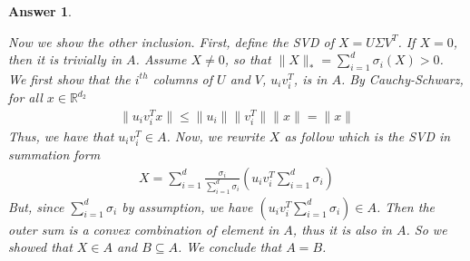 \documentclass[12pt]{article}
\theoremstyle{colon}
\newtheorem*{answer}{Answer}
\begin{document}
\begin{answer}
\begin{enumerate}[label=\arabic*)]
\begin{enumerate}[label=\alph*)]
          Now we show the other inclusion. First, define the SVD of $X = U \Sigma V^T$. If $X = 0$, then it is trivially in $A$. Assume $X \neq 0$, so that $\lVert X \rVert_* = \sum_{i=1}^d \sigma_i(X) > 0$. We first show that the $i^{th}$ columns of $U$ and $V$, $u_i v_i^T$, is in $A$. By Cauchy-Schwarz, for all $x \in \mathbb{R}^{d_2}$
          \begin{gather*}
            \lVert u_i v_i^T x \rVert \leq \lVert u_i \rVert \lVert v_i^T \rVert \lVert x \rVert = \lVert x \rVert
          \end{gather*}
          Thus, we have that $u_i v_i^T \in A$. Now, we rewrite $X$ as follow which is the SVD in summation form
          \begin{gather*}
            X = \sum_{i=1}^d \frac{\sigma_i}{\sum_{i=1}^d \sigma_i} (u_i v_i^T \sum_{i=1}^d \sigma_i)
          \end{gather*}
          But, since $\sum_{i=1}^d \sigma_i$ by assumption, we have $(u_i v_i^T \sum_{i=1}^d \sigma_i) \in A$. Then the outer sum is a convex combination of element in $A$, thus it is also in $A$. So we showed that $X \in A$ and $B \subseteq A$. We conclude that $A = B$.
      \end{enumerate}


\end{enumerate}
\end{answer}
\end{document}
